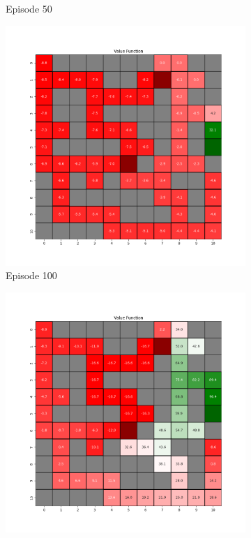 \documentclass{assignment}
\begin{document}
\begin{figure}[H]
\begin{subfigure}{0.3\textwidth}
    \caption{Episode 50}
    \end{subfigure}\hfill
    \begin{subfigure}{0.3\textwidth}
        \includegraphics[width=\textwidth]{figures/value_q/epsilon_sweep/value_function_alpha_0.1_gamma_0.95_epsilon_0.5_iteration_100.png}
    \caption{Episode 100}
    \end{subfigure}
    \begin{subfigure}{0.3\textwidth}
        \includegraphics[width=\textwidth]{figures/value_q/epsilon_sweep/value_function_alpha_0.1_gamma_0.95_epsilon_0.5_iteration_1000.png}

\end{subfigure}
\end{figure}
\end{document}
